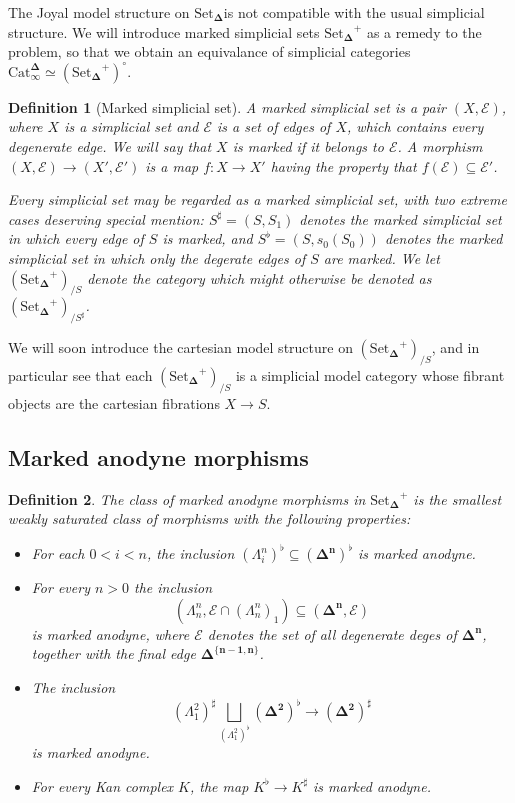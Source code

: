 \documentclass[12pt]{amsart}
\newcommand{\8}{\ensuremath{\infty}}
\newcommand{\Horn}[2]{\ensuremath{\Lambda^{#1}_{#2}}}
\newcommand{\Simplex}[1][n]{\ensuremath{\boldsymbol{\Delta^{#1}}}}
\newcommand{\SSet}{\ensuremath{\text{Set}_{\boldsymbol{\Delta}}}}
\newcommand{\Catinfdel}{\ensuremath{\text{Cat}^{\boldsymbol{\Delta}}_{\infty}}}
\newtheorem{definition}{Definition}
\begin{document}
The Joyal model structure on \SSet is not compatible with the usual simplicial structure. We will introduce marked simplicial sets $\SSet^+$ as a remedy to the problem, so that we obtain an equivalance of simplicial categories $\Catinfdel \simeq (\SSet^+)^\circ$.

\begin{definition}[Marked simplicial set]
  A marked simplicial set is a pair $(X, \mathcal{E})$, where $X$ is a simplicial set and $\mathcal{E}$ is a set of edges of $X$, which contains every degenerate edge. We will say that $X$ is marked if it belongs to $\mathcal{E}$. A morphism $(X, \mathcal{E}) \rightarrow (X', \mathcal{E}')$ is a map $f : X \rightarrow X'$ having the property that $f(\mathcal{E}) \subseteq \mathcal{E}'$.

  Every simplicial set may be regarded as a marked simplicial set, with two extreme cases deserving special mention: $S^\sharp = (S, S_1)$ denotes the marked simplicial set in which every edge of $S$ is marked, and $S^\flat = (S, s_0(S_0))$ denotes the marked simplicial set in which only the degerate edges of $S$ are marked. We let $(\SSet^+)_{/S}$ denote the category which might otherwise be denoted as $(\SSet^+)_{/S^\sharp}$.
\end{definition}

We will soon introduce the cartesian model structure on $(\SSet^+)_{/S}$, and in particular see that each $(\SSet^+)_{/S}$ is a simplicial model category whose fibrant objects are the cartesian fibrations $X \rightarrow S$.

\subsection{Marked anodyne morphisms}

\begin{definition}
  The class of marked anodyne morphisms in $\SSet^+$ is the smallest weakly saturated class of morphisms with the following properties:

  \begin{itemize}
    \item For each $0 < i < n$, the inclusion $(\Horn{n}{i})^\flat \subseteq (\Simplex)^\flat$ is marked anodyne.
    \item For every $n > 0$ the inclusion
          $$
            (\Horn{n}{n}, \mathcal{E} \cap (\Horn{n}{n})_1) \subseteq (\Simplex, \mathcal{E})
          $$
          is marked anodyne, where $\mathcal{E}$ denotes the set of all degenerate deges of \Simplex, together with the final edge \Simplex[\{n - 1, n\}].
    \item The inclusion
          $$
            (\Horn{2}{1})^\sharp \bigsqcup_{(\Horn{2}{1})^\flat} (\Simplex[2])^\flat \rightarrow (\Simplex[2])^\sharp
          $$
          is marked anodyne.
    \item For every Kan complex $K$, the map $K^\flat \rightarrow K^\sharp$ is marked anodyne.
  \end{itemize}
\end{definition}
\end{document}

